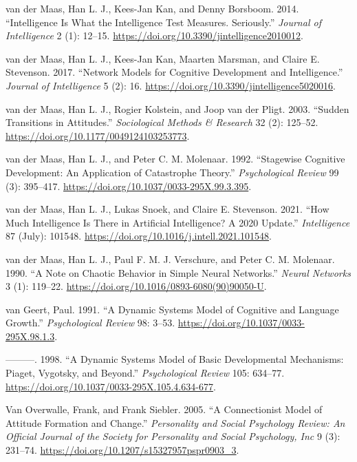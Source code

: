 \documentclass[
  a4paper,
  DIV=11,
  numbers=noendperiod,
  oneside]{scrreprt}
\newlength{\cslhangindent}
\newenvironment{CSLReferences}[2] %
 {\begin{list}{}{%
  \setlength{\itemindent}{0pt}
  \setlength{\leftmargin}{0pt}
  \setlength{\parsep}{0pt}
  \ifodd #1
   \setlength{\leftmargin}{\cslhangindent}
   \setlength{\itemindent}{-1\cslhangindent}
  \fi
  \setlength{\itemsep}{#2\baselineskip}}}
 {\end{list}}
\begin{document}
\begin{CSLReferences}{1}{0}
van der Maas, Han L. J., Kees-Jan Kan, and Denny Borsboom. 2014.
{``Intelligence Is What the Intelligence Test Measures. Seriously.''}
\emph{Journal of Intelligence} 2 (1): 12--15.
\url{https://doi.org/10.3390/jintelligence2010012}.

van der Maas, Han L. J., Kees-Jan Kan, Maarten Marsman, and Claire E.
Stevenson. 2017. {``Network {Models} for {Cognitive Development} and
{Intelligence}.''} \emph{Journal of Intelligence} 5 (2): 16.
\url{https://doi.org/10.3390/jintelligence5020016}.

van der Maas, Han L. J., Rogier Kolstein, and Joop van der Pligt. 2003.
{``Sudden {Transitions} in {Attitudes}.''} \emph{Sociological Methods \&
Research} 32 (2): 125--52.
\url{https://doi.org/10.1177/0049124103253773}.

van der Maas, Han L. J., and Peter C. M. Molenaar. 1992. {``Stagewise
Cognitive Development: An Application of Catastrophe Theory.''}
\emph{Psychological Review} 99 (3): 395--417.
\url{https://doi.org/10.1037/0033-295X.99.3.395}.

van der Maas, Han L. J., Lukas Snoek, and Claire E. Stevenson. 2021.
{``How Much Intelligence Is There in Artificial Intelligence? {A} 2020
Update.''} \emph{Intelligence} 87 (July): 101548.
\url{https://doi.org/10.1016/j.intell.2021.101548}.

van der Maas, Han L. J., Paul F. M. J. Verschure, and Peter C. M.
Molenaar. 1990. {``A Note on Chaotic Behavior in Simple Neural
Networks.''} \emph{Neural Networks} 3 (1): 119--22.
\url{https://doi.org/10.1016/0893-6080(90)90050-U}.

van Geert, Paul. 1991. {``A Dynamic Systems Model of Cognitive and
Language Growth.''} \emph{Psychological Review} 98: 3--53.
\url{https://doi.org/10.1037/0033-295X.98.1.3}.

---------. 1998. {``A Dynamic Systems Model of Basic Developmental
Mechanisms: {Piaget}, {Vygotsky}, and Beyond.''} \emph{Psychological
Review} 105: 634--77.
\url{https://doi.org/10.1037/0033-295X.105.4.634-677}.

Van Overwalle, Frank, and Frank Siebler. 2005. {``A Connectionist Model
of Attitude Formation and Change.''} \emph{Personality and Social
Psychology Review: An Official Journal of the Society for Personality
and Social Psychology, Inc} 9 (3): 231--74.
\url{https://doi.org/10.1207/s15327957pspr0903_3}.


\end{CSLReferences}
\end{document}
